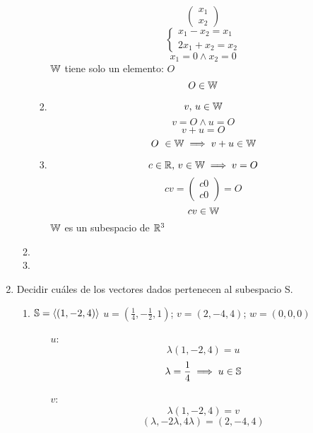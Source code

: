 \documentclass[../practica.root.tex]{subfiles}
\begin{document}
\begin{enumerate}
\begin{enumerate}
\begin{enumerate}
\[\begin{pmatrix}
                                      x_1 \\ x_2
                                  \end{pmatrix}
                              \]
                              \[
                                  \begin{cases}
                                      x_1 - x_2 = x_1 \\
                                      2x_1 + x_2 = x_2
                                  \end{cases}
                              \]
                              \[ x_1 = 0 \land x_2 = 0 \]
                              $\W$ tiene solo un elemento: $O$
                              \[ O \in \W \]
                        \item \[ v\text{, }u \in \W \]
                              \[ v = O \land u = O \]
                              \[ v + u = O \]
                              \[ O \in \W \implies v + u \in \W \]
                        \item \[ c \in \R\text{, }v \in \W \implies v = O \]
                              \[ cv =
                                  \begin{pmatrix}
                                      c0 \\ c0
                                  \end{pmatrix}
                                  = O
                              \]
                              \[ cv \in \W \]
                              $\W$ es un subespacio de $\R^3$
                    \end{enumerate}
              \item
              \item
          \end{enumerate}
    \item Decidir cuáles de los vectores dados pertenecen al subespacio S.
          \begin{enumerate}
              \item $ \S = \langle (1,-2,4) \rangle $ \tabr $u = (\frac{1}{4}, -\frac{1}{2}, 1)$; $v = (2,-4,4)$; $w = (0,0,0)$
                    \begin{itemize}
                        \item[$u$:] \[ \lambda(1,-2,4) = u \]
                              \[ \lambda = \frac{1}{4} \implies u \in \S \]
                        \item[$v$:] \[ \lambda(1,-2,4) = v \]
                              \[ (\lambda, -2\lambda, 4\lambda) = (2, -4, 4) \]

\end{itemize}
\end{enumerate}
\end{enumerate}
\end{document}

